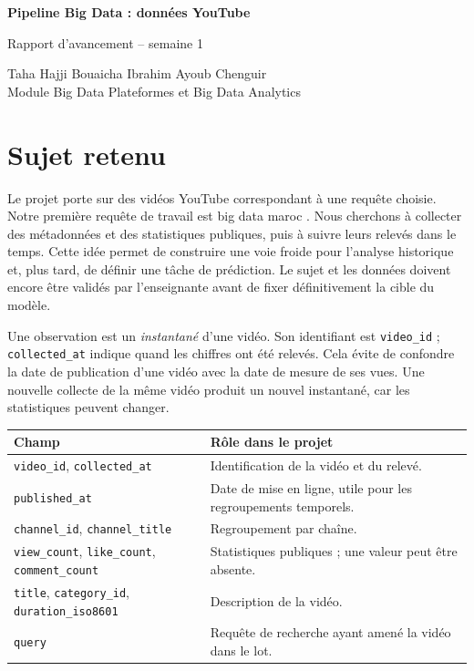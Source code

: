\documentclass[11pt,a4paper]{article}
\begin{document}
\begin{center}
{\Large\bfseries Pipeline Big Data : données YouTube\par}
\vspace{0.25em}
{\large Rapport d'avancement -- semaine 1\par}
\vspace{0.55em}
Taha Hajji \quad Bouaicha Ibrahim \quad Ayoub Chenguir\\
Module Big Data Plateformes et Big Data Analytics
\end{center}

\section{Sujet retenu}

Le projet porte sur des vidéos YouTube correspondant à une requête choisie. Notre première requête de travail est \og big data maroc \fg{}. Nous cherchons à collecter des métadonnées et des statistiques publiques, puis à suivre leurs relevés dans le temps. Cette idée permet de construire une voie froide pour l'analyse historique et, plus tard, de définir une tâche de prédiction. Le sujet et les données doivent encore être validés par l'enseignante avant de fixer définitivement la cible du modèle.

Une observation est un \emph{instantané} d'une vidéo. Son identifiant est \texttt{video\_id} ; \texttt{collected\_at} indique quand les chiffres ont été relevés. Cela évite de confondre la date de publication d'une vidéo avec la date de mesure de ses vues. Une nouvelle collecte de la même vidéo produit un nouvel instantané, car les statistiques peuvent changer.

\begin{center}
\small
\begin{tabular}{p{4.5cm}p{9.4cm}}
\toprule
Champ & Rôle dans le projet \\
\midrule
\texttt{video\_id}, \texttt{collected\_at} & Identification de la vidéo et du relevé. \\
\texttt{published\_at} & Date de mise en ligne, utile pour les regroupements temporels. \\
\texttt{channel\_id}, \texttt{channel\_title} & Regroupement par chaîne. \\
\texttt{view\_count}, \texttt{like\_count}, \texttt{comment\_count} & Statistiques publiques ; une valeur peut être absente. \\
\texttt{title}, \texttt{category\_id}, \texttt{duration\_iso8601} & Description de la vidéo. \\
\texttt{query} & Requête de recherche ayant amené la vidéo dans le lot. \\
\bottomrule
\end{tabular}
\end{center}
\end{document}
